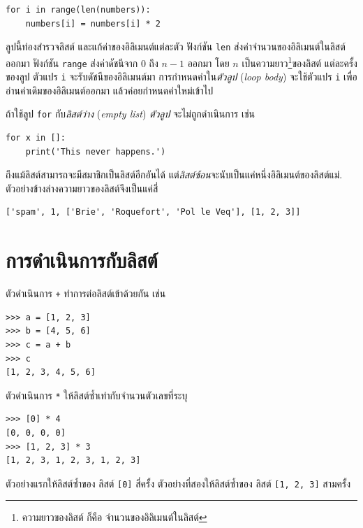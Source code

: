 \begin{verbatim}
for i in range(len(numbers)):
    numbers[i] = numbers[i] * 2
\end{verbatim}
%
ลูปนี้ท่องสำรวจลิสต์ และแก้ค่าของอิลิเมนต์แต่ละตัว
ฟังก์ชัน \texttt{len} ส่งค่าจำนวนของอิลิเมนต์ในลิสต์ออกมา
ฟังก์ชัน \texttt{range} ส่งค่าดัชนีจาก {\scriptsize$0$} ถึง {\scriptsize$n-1$} ออกมา โดย {\scriptsize$n$} เป็นความยาว\footnote{
ความยาวของลิสต์ ก็คือ จำนวนของอิลิเมนต์ในลิสต์
}ของลิสต์
แต่ละครั้งของลูป ตัวแปร \texttt{i} จะรับดัชนีของอิลิเมนต์มา
การกำหนดค่าใน\textit{ตัวลูป} (\textit{loop body}) จะใช้ตัวแปร \texttt{i} เพื่ออ่านค่าเดิมของอิลิเมนต์ออกมา แล้วค่อยกำหนดค่าใหม่เข้าไป

ถ้าใช้ลูป \texttt{for} กับ\textit{ลิสต์ว่าง} (\textit{empty list}) \textit{ตัวลูป} จะไม่ถูกดำเนินการ เช่น

\begin{verbatim}
for x in []:
    print('This never happens.')
\end{verbatim}
%
ถึงแม้ลิสต์สามารถจะมีสมาชิกเป็นลิสต์อีกอันได้ แต่\textit{ลิสต์ซ้อน}จะนับเป็นแค่หนึ่งอิลิเมนต์ของลิสต์แม่. ตัวอย่างข้างล่างความยาวของลิสต์จึงเป็นแค่สี่

\begin{verbatim}
['spam', 1, ['Brie', 'Roquefort', 'Pol le Veq'], [1, 2, 3]]
\end{verbatim}

\section{การดำเนินการกับลิสต์}

ตัวดำเนินการ \texttt{+} ทำการต่อลิสต์เข้าด้วยกัน เช่น

\begin{verbatim}
>>> a = [1, 2, 3]
>>> b = [4, 5, 6]
>>> c = a + b
>>> c
[1, 2, 3, 4, 5, 6]
\end{verbatim}
%
ตัวดำเนินการ \texttt{*} ให้ลิสต์ซ้ำเท่ากับจำนวนตัวเลขที่ระบุ

\begin{verbatim}
>>> [0] * 4
[0, 0, 0, 0]
>>> [1, 2, 3] * 3
[1, 2, 3, 1, 2, 3, 1, 2, 3]
\end{verbatim}
%
ตัวอย่างแรกให้ลิสต์ซ้ำของ ลิสต์ \texttt{[0]} สี่ครั้ง  
ตัวอย่างที่สองให้ลิสต์ซ้ำของ ลิสต์ \texttt{[1, 2, 3]} สามครั้ง


